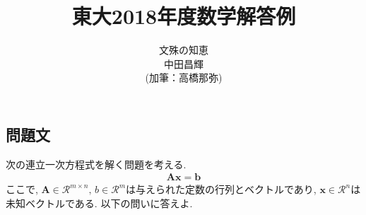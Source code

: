 \documentclass[dvipdfmx,titlepage, 11pt, a4paper]{jsarticle}%
\title{\Huge 東大2018年度数学解答例\\[10mm]}
\author{{\LARGE 文殊の知恵}\\[1mm]\LARGE 中田昌輝\\(加筆：高橋那弥)}
\date{}
\begin{document}
\newcommand{\dix}{\,{\rm d}}
\maketitle
\tableofcontents %
\newpage
\setcounter{tocdepth}{3}%
\section{}%
\subsection{問題文}
次の連立一次方程式を解く問題を考える.
\begin{eqnarray*}
	\bm{A}\bm{x} = \bm{b}
\end{eqnarray*}
ここで, $\bm{A}\in \mathcal{R}^{m\times n},\,b\in \mathcal{R}^{m}$は与えられた定数の行列とベクトルであり, $\bm{x}\in \mathcal{R}^{n}$は未知ベクトルである. 以下の問いに答えよ.
\end{document}
